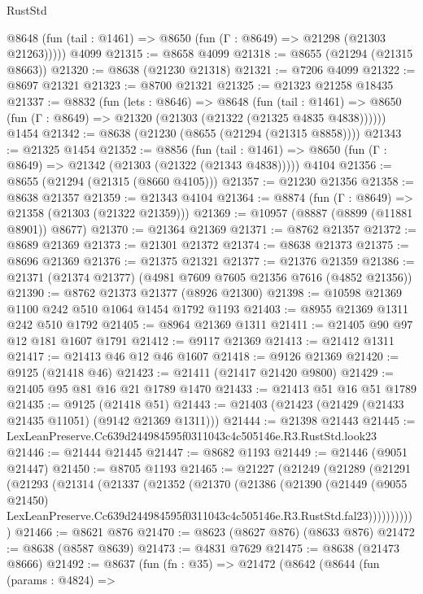 \begin{lexlean}{RustStd}
\begin{coremodule}
      @8648 (fun (tail : @1461) => @8650 (fun (Γ : @8649) => @21298 (@21303 @21263)))))
    @4099
@21315 := @8658 @4099
@21318 := @8655 (@21294 (@21315 @8663))
@21320 := @8638 (@21230 @21318)
@21321 := @7206 @4099
@21322 := @8697 @21321
@21323 := @8700 @21321
@21325 := @21323 @21258 @18435
@21337 := @8832
    (fun (lets : @8646) =>
    @8648
      (fun (tail : @1461) =>
      @8650 (fun (Γ : @8649) => @21320 (@21303 (@21322 (@21325 @4835 @4838))))))
    @1454
@21342 := @8638 (@21230 (@8655 (@21294 (@21315 @8858))))
@21343 := @21325 @1454
@21352 := @8856
    (fun (tail : @1461) => @8650 (fun (Γ : @8649) => @21342 (@21303 (@21322 (@21343 @4838)))))
    @4104
@21356 := @8655 (@21294 (@21315 (@8660 @4105)))
@21357 := @21230 @21356
@21358 := @8638 @21357
@21359 := @21343 @4104
@21364 := @8874 (fun (Γ : @8649) => @21358 (@21303 (@21322 @21359)))
@21369 := @10957 (@8887 (@8899 (@11881 @8901)) @8677)
@21370 := @21364 @21369
@21371 := @8762 @21357
@21372 := @8689 @21369
@21373 := @21301 @21372
@21374 := @8638 @21373
@21375 := @8696 @21369
@21376 := @21375 @21321
@21377 := @21376 @21359
@21386 := @21371 (@21374 @21377) (@4981 @7609 @7605 @21356 @7616 (@4852 @21356))
@21390 := @8762 @21373 @21377 (@8926 @21300)
@21398 := @10598 @21369 @1100 @242 @510 @1064 @1454 @1792 @1193
@21403 := @8955 @21369 @1311 @242 @510 @1792
@21405 := @8964 @21369 @1311
@21411 := @21405 @90 @97 @12 @181 @1607 @1791
@21412 := @9117 @21369
@21413 := @21412 @1311
@21417 := @21413 @46 @12 @46 @1607
@21418 := @9126 @21369
@21420 := @9125 (@21418 @46)
@21423 := @21411 (@21417 @21420 @9800)
@21429 := @21405 @95 @81 @16 @21 @1789 @1470
@21433 := @21413 @51 @16 @51 @1789
@21435 := @9125 (@21418 @51)
@21443 := @21403 (@21423 (@21429 (@21433 @21435 @11051) (@9142 @21369 @1311)))
@21444 := @21398 @21443
@21445 := LexLeanPreserve.Cc639d244984595f0311043c4c505146e.R3.RustStd.look23
@21446 := @21444 @21445
@21447 := @8682 @1193
@21449 := @21446 (@9051 @21447)
@21450 := @8705 @1193
@21465 := @21227
    (@21249
      (@21289
        (@21291
          (@21293
            (@21314
              (@21337
                (@21352
                  (@21370
                    (@21386
                      (@21390
                        (@21449
                          (@9055 @21450)
                          LexLeanPreserve.Cc639d244984595f0311043c4c505146e.R3.RustStd.fal23)))))))))))
@21466 := @8621 @876
@21470 := @8623 (@8627 @876) (@8633 @876)
@21472 := @8638 (@8587 @8639)
@21473 := @4831 @7629
@21475 := @8638 (@21473 @8666)
@21492 := @8637
    (fun (fn : @35) =>
    @21472
      (@8642
        (@8644
          (fun (params : @4824) =>

\end{coremodule}
\end{lexlean}
